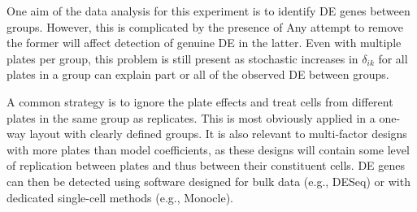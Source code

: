 \documentclass[oupdraft]{bio}
\begin{document}

One aim of the data analysis for this experiment is to identify DE genes between groups.
However, this is complicated by the presence of 
Any attempt to remove the former will affect detection of genuine DE in the latter.
Even with multiple plates per group, this problem is still present as stochastic increases in $\delta_{ik}$ for all plates in a group can explain part or all of the observed DE between groups.

A common strategy is to ignore the plate effects and treat cells from different plates in the same group as replicates.
This is most obviously applied in a one-way layout with clearly defined groups.
It is also relevant to multi-factor designs with more plates than model coefficients, as these designs will contain some level of replication between plates and thus between their constituent cells.
DE genes can then be detected using software designed for bulk data (e.g., DESeq) or with dedicated single-cell methods (e.g., Monocle).
\end{document}
